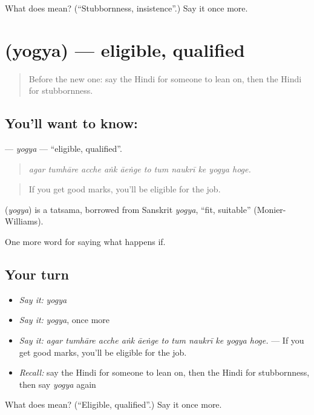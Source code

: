 \begin{tcolorbox}[breakable,colback=teal!4,colframe=teal!35!black,title={Before you move on}]
What does  mean? (\textquotedblleft{}Stubbornness, insistence\textquotedblright{}.) Say it once more.
\end{tcolorbox}
\section[\texorpdfstring{\hi{योग्य} (yogya)}{योग्य (yogya)}]{ (yogya) — eligible, qualified}

\label{lesson:HI-C386-yogya}



\begin{quote}
Before the new one: say the Hindi for someone to lean on, then the Hindi for stubbornness.
\end{quote}

\subsection*{You'll want to know: }
\textbf{} — \emph{yogya} — \textquotedblleft{}eligible, qualified\textquotedblright{}.

\begin{quote}
          
\end{quote}

\begin{quote}
\emph{agar tumhāre acche aṅk āeṅge to tum naukrī ke yogya hoge.}
\end{quote}

\begin{quote}
If you get good marks, you'll be eligible for the job.
\end{quote}

\begin{cousinweb}
\textbf{} (\emph{yogya}) is a tatsama, borrowed from Sanskrit \emph{yogya}, \textquotedblleft{}fit, suitable\textquotedblright{} (Monier-Williams).
\end{cousinweb}

\begin{grammarlens}[title={What you've built}]
One more word for saying what happens if.
\end{grammarlens}

\subsection*{Your turn}
\begin{itemize}
\raggedright
  \item \emph{Say it:} \emph{yogya}
  \item \emph{Say it:} \emph{yogya}, once more
  \item \emph{Say it:} \emph{agar tumhāre acche aṅk āeṅge to tum naukrī ke yogya hoge.} — If you get good marks, you'll be eligible for the job.
  \item \emph{Recall:} say the Hindi for someone to lean on, then the Hindi for stubbornness, then say \emph{yogya} again
\end{itemize}

\begin{tcolorbox}[breakable,colback=teal!4,colframe=teal!35!black,title={Before you move on}]
What does  mean? (\textquotedblleft{}Eligible, qualified\textquotedblright{}.) Say it once more.
\end{tcolorbox}
